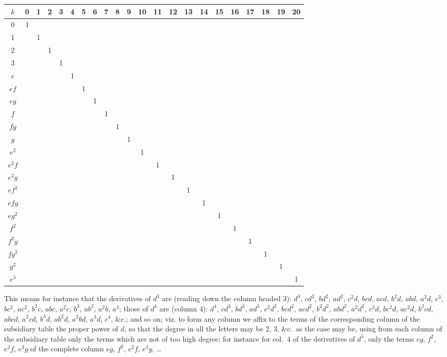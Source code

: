\documentclass[11pt,a4paper]{article}
\theoremstyle{definition}
\begin{document}
\begin{center}
\small
\begin{tabular}{c|ccccccccccccccccccccc}
$k$ & 0 & 1 & 2 & 3 & 4 & 5 & 6 & 7 & 8 & 9 & 10 & 11 & 12 & 13 & 14 & 15 & 16 & 17 & 18 & 19 & 20\\
\midrule
0 & 1 & & & & & & & & & & & & & & & & & & & & \\
1 & & 1 & & & & & & & & & & & & & & & & & & & \\
2 & & & 1 & & & & & & & & & & & & & & & & & & \\
3 & & & & 1 & & & & & & & & & & & & & & & & & \\
$e$ & & & & & 1 & & & & & & & & & & & & & & & & \\
$ef$ & & & & & & 1 & & & & & & & & & & & & & & & \\
$eg$ & & & & & & & 1 & & & & & & & & & & & & & & \\
$f$ & & & & & & & & 1 & & & & & & & & & & & & & \\
$fg$ & & & & & & & & & 1 & & & & & & & & & & & & \\
$g$ & & & & & & & & & & 1 & & & & & & & & & & & \\
$e^2$ & & & & & & & & & & & 1 & & & & & & & & & & \\
$e^2f$ & & & & & & & & & & & & 1 & & & & & & & & & \\
$e^2g$ & & & & & & & & & & & & & 1 & & & & & & & & \\
$ef^2$ & & & & & & & & & & & & & & 1 & & & & & & & \\
$efg$ & & & & & & & & & & & & & & & 1 & & & & & & \\
$eg^2$ & & & & & & & & & & & & & & & & 1 & & & & & \\
$f^2$ & & & & & & & & & & & & & & & & & 1 & & & & \\
$f^2g$ & & & & & & & & & & & & & & & & & & 1 & & & \\
$fg^2$ & & & & & & & & & & & & & & & & & & & 1 & & \\
$g^2$ & & & & & & & & & & & & & & & & & & & & 1 & \\
$e^3$ & & & & & & & & & & & & & & & & & & & & & 1\\
\end{tabular}
\normalsize
\end{center}

This means for instance that the derivatives of $d^3$ are (reading down the column headed 3): $d^3$, $cd^2$, $bd^2$, $ad^2$, $c^2d$, $bcd$, $acd$, $b^2d$, $abd$, $a^2d$, $c^3$, $bc^2$, $ac^2$, $b^2c$, $abc$, $a^2c$, $b^3$, $ab^2$, $a^2b$, $a^3$; those of $d^4$ are (column 4): $d^4$, $cd^3$, $bd^3$, $ad^3$, $c^2d^2$, $bcd^2$, $acd^2$, $b^2d^2$, $abd^2$, $a^2d^2$, $c^3d$, $bc^2d$, $ac^2d$, $b^2cd$, $abcd$, $a^2cd$, $b^3d$, $ab^2d$, $a^2bd$, $a^3d$, $c^4$, \&c.; and so on; viz. to form any column we affix to the terms of the corresponding column of the subsidiary table the proper power of $d$, so that the degree in all the letters may be 2, 3, \&c.\ as the case may be, using from each column of the subsidiary table only the terms which are not of too high degree; for instance for col.~4 of the derivatives of $d^5$, only the terms $eg$, $f^2$, $e^2f$, $e^3g$ of the complete column $eg$, $f^2$, $e^2f$, $e^3g$, \ldots
\end{document}
